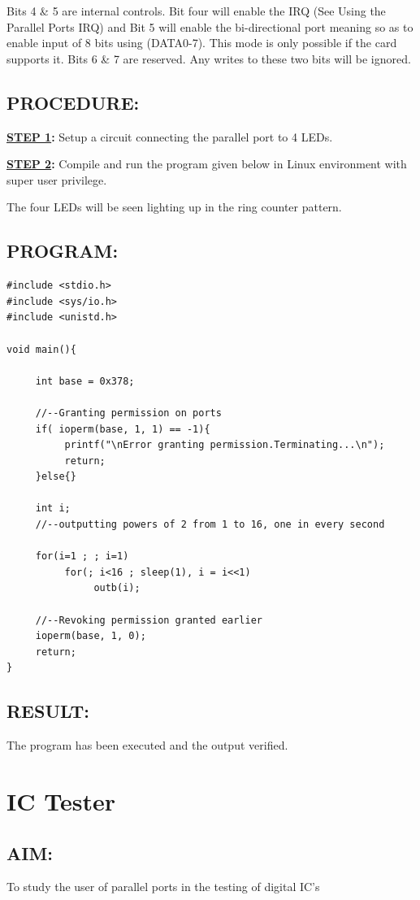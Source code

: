 \documentclass[a4paper,28pt]{report}
\begin{document}
Bits 4 \& 5 are internal controls. Bit four will enable the IRQ (See Using the Parallel Ports IRQ) and Bit 5 will enable the bi-directional port meaning so as to enable input of 8 bits using (DATA0-7). This mode is only possible if the card supports it. Bits 6 \& 7 are reserved. Any writes to these two bits will be ignored. 

\section*{PROCEDURE:}
\textbf{\underline{STEP 1}:} 
Setup a circuit connecting the parallel port to 4 LEDs.

\textbf{\underline{STEP 2}:} Compile and run the program given below in Linux environment with super user privilege.

The four LEDs will be seen lighting up in the ring counter pattern.

\section*{PROGRAM:}
\begin{lstlisting}
#include <stdio.h>
#include <sys/io.h>
#include <unistd.h>

void main(){

     int base = 0x378;
     
     //--Granting permission on ports
     if( ioperm(base, 1, 1) == -1){
          printf("\nError granting permission.Terminating...\n");
          return;
     }else{}
     
     int i;
     //--outputting powers of 2 from 1 to 16, one in every second
     
     for(i=1 ; ; i=1)
          for(; i<16 ; sleep(1), i = i<<1)
               outb(i);
     
     //--Revoking permission granted earlier
     ioperm(base, 1, 0);
     return;  
}
\end{lstlisting}

\section*{RESULT:}
The program has been executed and the output verified.
%
%
%
%
\chapter{IC Tester}
%
%
\section*{AIM:}
To study the user of parallel ports in the testing of digital IC's
\end{document}
